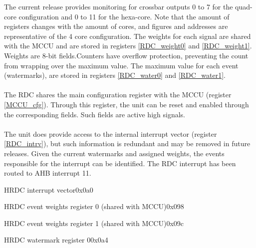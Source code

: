 The current release provides monitoring for crossbar outputs 0 to 7 for the quad-core configuration and 0 to 11 for the hexa-core. Note that the amount of registers changes with the amount of cores, and figures and addresses are representative of the 4 core configuration. The weights for each signal are shared with the MCCU and are stored in registers \ref{RDC_weight0} and \ref{RDC_weight1}. Weights are 8-bit fields.Counters have overflow protection, preventing the count from wrapping over the maximum value.  The maximum value for each event (watermarks), are stored in registers \ref{RDC_water0} and \ref{RDC_water1}.\\
\\
The RDC shares the main configuration register with the MCCU (register \ref{MCCU_cfg}). Through this register, the unit can be reset and enabled through the corresponding fields. Such fields are active high signals. \\
\\
The unit does provide access to the internal interrupt vector (register \ref{RDC_intrv}), but such information is redundant and may be removed in future releases. Given the current watermarks and assigned weights, the events responsible for the interrupt can be identified.  The RDC interrupt has been routed to AHB interrupt 11.


\begin{register}{H}{RDC interrupt vector}{0x0a0}
	\label{RDC_intrv}
	\regnewline
\end{register}
\begin{register}{H}{RDC event weights register 0 (shared with MCCU)}{0x098}
	\label{RDC_weight0}
	\regnewline
\end{register}
\begin{register}{H}{RDC event weights register 1 (shared with MCCU)}{0x09c}
	\label{RDC_weight1}
	\regnewline
\end{register}


\begin{register}{H}{RDC watermark register 0}{0x0a4}
	\label{RDC_water0}
	\regnewline
\end{register}


